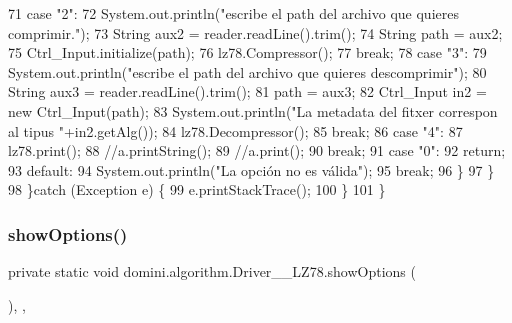 \begin{DoxyCode}
71                 \textcolor{keywordflow}{case} \textcolor{stringliteral}{"2"}:
72                     System.out.println(\textcolor{stringliteral}{"escribe el path del archivo que quieres comprimir."});
73                     String aux2 = reader.readLine().trim();
74                     String path = aux2;
75                     Ctrl\_Input.initialize(path);
76                     lz78.Compressor();
77                 \textcolor{keywordflow}{break};
78                 \textcolor{keywordflow}{case} \textcolor{stringliteral}{"3"}:
79                     System.out.println(\textcolor{stringliteral}{"escribe el path del archivo que quieres descomprimir"});
80                     String aux3 = reader.readLine().trim();
81                     path = aux3;
82                     Ctrl\_Input in2 = \textcolor{keyword}{new} Ctrl\_Input(path);
83                     System.out.println(\textcolor{stringliteral}{"La metadata del fitxer correspon al tipus "}+in2.getAlg());
84                     lz78.Decompressor();
85                 \textcolor{keywordflow}{break};
86                 \textcolor{keywordflow}{case} \textcolor{stringliteral}{"4"}:
87                     lz78.print();
88                     \textcolor{comment}{//a.printString();}
89                     \textcolor{comment}{//a.print();}
90                 \textcolor{keywordflow}{break};
91                 \textcolor{keywordflow}{case} \textcolor{stringliteral}{"0"}:
92                     \textcolor{keywordflow}{return};
93                 \textcolor{keywordflow}{default}:
94                     System.out.println(\textcolor{stringliteral}{"La opción no es válida"});
95                 \textcolor{keywordflow}{break};
96             \}
97         \}
98     \}\textcolor{keywordflow}{catch} (Exception e) \{
99         e.printStackTrace();
100     \}
101     \}
\end{DoxyCode}
\mbox{\label{classdomini_1_1algorithm_1_1Driver____LZ78_af5e77bd40dbe6c3fa84ee5ee996b6dfe}} 
\subsubsection{\texorpdfstring{show\+Options()}{showOptions()}}
{\footnotesize\ttfamily private static void domini.\+algorithm.\+Driver\+\_\+\+\_\+\+L\+Z78.\+show\+Options (\begin{DoxyParamCaption}{ }\end{DoxyParamCaption})\hspace{0.3cm}{\ttfamily [inline]}, {\ttfamily [static]}, {\ttfamily [private]}}



